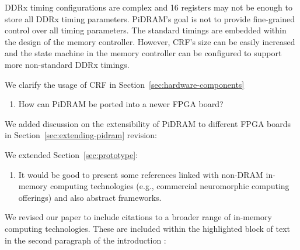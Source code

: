 DDRx timing configurations are complex and 16 registers may not be enough to store all DDRx timing parameters. PiDRAM's goal is not to provide fine-grained control over all timing parameters. The standard timings are embedded within the design of the memory controller. However, CRF’s size can be easily increased and the state machine in the memory controller can be configured to support more non-standard DDRx timings.

We clarify the usage of CRF in Section~\ref{sec:hardware-components} 

\vspace{5pt}
\yyboxbegin 
{}
\yyboxend 

\newpage
\begin{tcolorbox}
    \begin{enumerate}[label=R3/\arabic*]
       \addtocounter{enumi}{6}
        \item \label{q:r3q7} How can PiDRAM be ported into a newer FPGA board?
    \end{enumerate}
\end{tcolorbox} 

We added discussion on the extensibility of PiDRAM to different FPGA boards in Section~\ref{sec:extending-pidram}  revision:

\vspace{5pt}
\yyboxbegin 
{}
\yyboxend

We extended Section~\ref{sec:prototype}:

\vspace{5pt}
\yyboxbegin 
{}
\yyboxend

\newpage
\begin{center}
    {\Large {}}
\end{center}

\begin{tcolorbox}
    \begin{enumerate}[label=R4/\arabic*]
        \item \label{q:r4q1} It would be good to present some references linked with non-DRAM in-memory computing technologies (e.g., commercial neuromorphic computing offerings) and also abstract frameworks.
    \end{enumerate}
\end{tcolorbox} 

We revised our paper to include citations to a broader range of in-memory computing technologies. These are included within the highlighted block of text in the second paragraph of the introduction :

